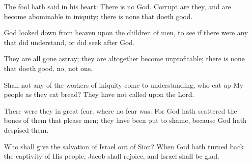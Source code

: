 The fool hath said in his heart: There is no God. Corrupt are they, and are become abominable in iniquity; there is none that doeth good.

God looked down from heaven upon the children of men, to see if there were any that did understand, or did seek after God.

They are all gone astray; they are altogether become unprofitable; there is none that doeth good, no, not one.

Shall not any of the workers of iniquity come to understanding, who eat up My people as they eat bread? They have not called upon the Lord.

There were they in great fear, where no fear was. For God hath scattered the bones of them that please men; they have been put to shame, because God hath despised them.

Who shall give the salvation of Israel out of Sion? When God hath turned back the captivity of His people, Jacob shall rejoice, and Israel shall be glad.
